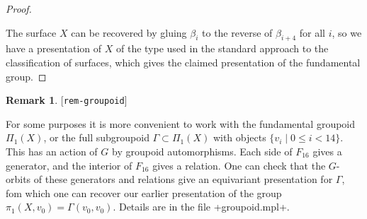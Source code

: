 \documentclass[reqno]{amsart}
\newcommand{\lbl}[1]{\label{#1}\textup{[\texttt{#1}]}\par}
\newcommand{\lbl}{\label}
\newcommand{\Gm}        {\Gamma}
\newcommand{\bt}        {\beta}
\newcommand{\st}        {\;|\;}
\renewcommand{\:}{\colon}
\theoremstyle{definition}
\newtheorem{remark}[theorem]{Remark}
\begin{document}
\begin{proof}
\begin{center}
 \end{center}
 The surface $X$ can be recovered by gluing $\bt_i$ to the reverse of
 $\bt_{i+4}$ for all $i$, so we have a presentation of $X$ of the type
 used in the standard approach to the classification of surfaces,
 which gives the claimed presentation of the fundamental group.
\end{proof}

\begin{remark}\lbl{rem-groupoid}
 For some purposes it is more convenient to work with the fundamental
 groupoid $\Pi_1(X)$, or the full subgroupoid $\Gm\subset\Pi_1(X)$
 with objects $\{v_i\st 0\leq i<14\}$.  This has an action of $G$ by
 groupoid automorphisms.  Each side of $F_{16}$ gives a generator, and
 the interior of $F_{16}$ gives a relation.  One can check that the
 $G$-orbits of these generators and relations give an equivariant
 presentation for $\Gm$, fom which one can recover our earlier
 presentation of the group $\pi_1(X,v_0)=\Gm(v_0,v_0)$.  Details are
 in the file \fname+groupoid.mpl+. 
\end{remark}
\end{document}
